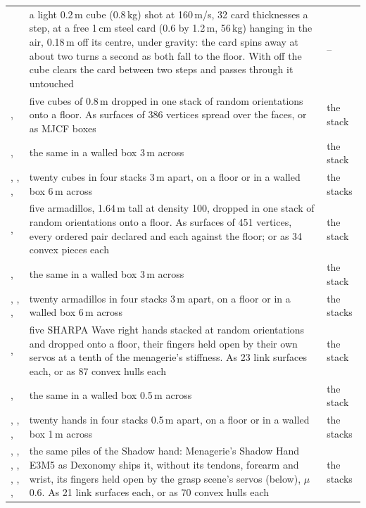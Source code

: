 \begin{longtable}{@{}L{44mm}L{92mm}L{17mm}@{}}
 & a light 0.2\,m cube (0.8\,kg) shot at 160\,m/s, 32 card thicknesses a step, at a free 1\,cm steel card (0.6 by 1.2\,m, 56\,kg) hanging in the air, 0.18\,m off its centre, under gravity: the card spins away at about two turns a second as both fall to the floor. With  off the cube clears the card between two steps and passes through it untouched & -- \\
,  & five cubes of 0.8\,m dropped in one stack of random orientations onto a floor. As surfaces of 386 vertices spread over the faces, or as MJCF boxes & the stack \\
,  & the same in a walled box 3\,m across & the stack \\
, , ,  & twenty cubes in four stacks 3\,m apart, on a floor or in a walled box 6\,m across & the stacks \\
,  & five armadillos, 1.64\,m tall at density 100, dropped in one stack of random orientations onto a floor. As surfaces of 451 vertices, every ordered pair declared and each against the floor; or as 34 convex pieces each & the stack \\
,  & the same in a walled box 3\,m across & the stack \\
, , ,  & twenty armadillos in four stacks 3\,m apart, on a floor or in a walled box 6\,m across & the stacks \\
,  & five SHARPA Wave right hands stacked at random orientations and dropped onto a floor, their fingers held open by their own servos at a tenth of the menagerie's stiffness. As 23 link surfaces each, or as 87 convex hulls each & the stack \\
,  & the same in a walled box 0.5\,m across & the stack \\
, , ,  & twenty hands in four stacks 0.5\,m apart, on a floor or in a walled box 1\,m across & the stacks \\
, , , , , , ,  & the same piles of the Shadow hand: Menagerie's Shadow Hand E3M5 as Dexonomy ships it, without its tendons, forearm and wrist, its fingers held open by the grasp scene's servos (below), $\mu$ 0.6. As 21 link surfaces each, or as 70 convex hulls each & the stacks \\

\end{longtable}
